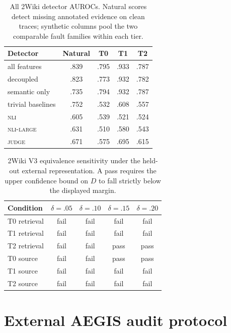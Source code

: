 \documentclass{article}
\begin{document}
\begin{table}[h]
\centering\scriptsize
\caption{All 2Wiki detector AUROCs. Natural scores detect missing annotated evidence on clean
traces; synthetic columns pool the two comparable fault families within each tier.}
\label{tab:2wiki-detectors}
\begin{tabular}{@{}lcccc@{}}
\toprule
Detector & Natural & T0 & T1 & T2 \\
\midrule
all features & .839 & .795 & .933 & .787 \\
decoupled & .823 & .773 & .932 & .782 \\
semantic only & .735 & .794 & .932 & .787 \\
trivial baselines & .752 & .532 & .608 & .557 \\
\textsc{nli} & .605 & .539 & .521 & .524 \\
\textsc{nli-large} & .631 & .510 & .580 & .543 \\
\textsc{judge} & .671 & .575 & .695 & .615 \\
\bottomrule
\end{tabular}
\end{table}

\begin{table}[h]
\centering\scriptsize
\caption{2Wiki V3 equivalence sensitivity under the held-out external representation. A pass
requires the upper confidence bound on $D$ to fall strictly below the displayed margin.}
\label{tab:2wiki-margins}
\begin{tabular}{@{}lcccc@{}}
\toprule
Condition & $\delta{=}.05$ & $\delta{=}.10$ & $\delta{=}.15$ & $\delta{=}.20$ \\
\midrule
T0 retrieval & fail & fail & fail & fail \\
T1 retrieval & fail & fail & fail & fail \\
T2 retrieval & fail & fail & pass & pass \\
T0 source & fail & fail & pass & pass \\
T1 source & fail & fail & fail & fail \\
T2 source & fail & fail & fail & fail \\
\bottomrule
\end{tabular}
\end{table}

\section{External AEGIS audit protocol}
\label{app:aegis}
\end{document}
